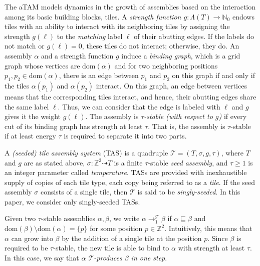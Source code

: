 \documentclass{article}
\theoremstyle{remark}
\theoremstyle{definition}
\newcommand{\tas}{\ensuremath{\mathcal{T}}}
\newcommand{\dom}{\ensuremath{\mathrm{dom}}}
\begin{document}
The aTAM models dynamics in the growth of assemblies based on the interaction among its basic building blocks, tiles. 
A {\it strength function $g: \Lambda(T) \to \mathbb{N}_0$} endows tiles with an ability to interact with its neighboring tiles by assigning the strength $g(\ell)$ to the {\it matching} label $\ell$ of their abutting edges.
If the labels do not match or $g(\ell) = 0$, these tiles do not interact; otherwise, they do. 
An assembly $\alpha$ and a strength function $g$ induce a {\it binding graph}, which is a grid graph whose vertices are $\dom(\alpha)$ and for two neighboring positions $p_1, p_2 \in \dom(\alpha)$, there is an edge between $p_1$ and $p_2$ on this graph if and only if the tiles $\alpha(p_1)$ and $\alpha(p_2)$ interact.  
On this graph, an edge between vertices means that the corresponding tiles interact, and hence, their abutting edges share the same label $\ell$. 
Thus, we can consider that the edge is labeled with $\ell$ and $g$ gives it the weight $g(\ell)$. 
The assembly is {\it $\tau$-stable (with respect to $g$)} if every cut of its binding graph has strength at least $\tau$. 
That is, the assembly is $\tau$-stable if at least energy $\tau$ is required to separate it into two parts. 

A {\it (seeded) tile assembly system} (TAS) is a quadruple $\tas = (T, \sigma, g, \tau)$, where $T$ and $g$ are as stated above, $\sigma: \mathbb{Z}^2 \dashrightarrow T$ is a finite $\tau$-stable {\it seed assembly}, and $\tau \ge 1$ is an integer parameter called {\it temperature}. 
TASs are provided with inexhaustible supply of copies of each tile type, each copy being referred to as a {\it tile}. 
If the seed assembly $\sigma$ consists of a single tile, then $\tas$ is said to be {\it singly-seeded}. 
In this paper, we consider only singly-seeded TASs.

Given two $\tau$-stable assemblies $\alpha, \beta$, we write $\alpha \to_1^{\tas} \beta$ if $\alpha \sqsubseteq \beta$ and $\dom(\beta) \setminus \dom(\alpha) = \{p\}$ for some position $p \in \mathbb{Z}^2$. 
Intuitively, this means that $\alpha$ can grow into $\beta$ by the addition of a single tile at the position $p$. 
Since $\beta$ is required to be $\tau$-stable, the new tile is able to bind to $\alpha$ with strength at least $\tau$. 
In this case, we say that {\it $\alpha$ $\tas$-produces $\beta$ in one step}. 
\end{document}
